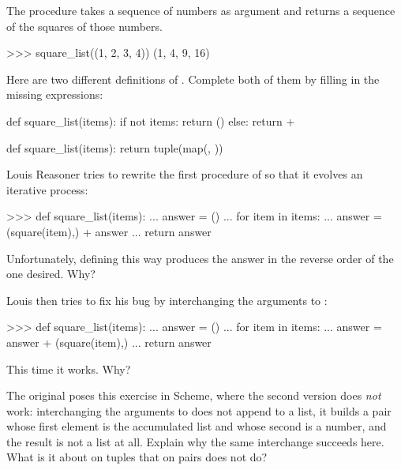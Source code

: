 \begin{exerciseGroup}
\label{Exercise 2.21}
 The procedure 
takes a sequence of numbers as argument and returns a sequence of the squares
of those numbers.

\begin{codeBlock}
>>> square_list((1, 2, 3, 4))
(1, 4, 9, 16)
\end{codeBlock}

Here are two different definitions of .  Complete both of
them by filling in the missing expressions:

\begin{syntaxForm}
def square_list(items):
    if not items:
        return ()
    else:
        return  + 

def square_list(items):
    return tuple(map(, ))
\end{syntaxForm}

\label{Exercise 2.22}
 Louis Reasoner tries to rewrite
the first  procedure of  so that it
evolves an iterative process:

\begin{codeBlock}
>>> def square_list(items):
...     answer = ()
...     for item in items:
...         answer = (square(item),) + answer
...     return answer
\end{codeBlock}

Unfortunately, defining  this way produces the answer in the
reverse order of the one desired.  Why?

Louis then tries to fix his bug by interchanging the arguments to \code{+}:

\begin{codeBlock}
>>> def square_list(items):
...     answer = ()
...     for item in items:
...         answer = answer + (square(item),)
...     return answer
\end{codeBlock}

This time it works.  Why?

The original poses this exercise in Scheme, where the second version does
\emph{not} work: interchanging the arguments to  does not append to
a list, it builds a pair whose first element is the accumulated list and whose
second is a number, and the result is not a list at all.  Explain why the same
interchange succeeds here.  What is it about \code{+} on tuples that
 on pairs does not do?


\end{exerciseGroup}

